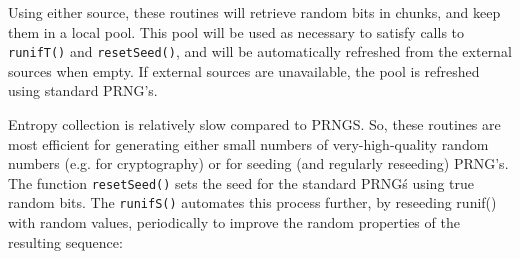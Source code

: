 \documentclass[11pt]{article}
\begin{document}
Using either source, these routines will retrieve random bits in chunks,
 and keep them in a local pool. This pool will be used as necessary to 
 satisfy calls to \texttt{runifT()} and \texttt{resetSeed()},
  and will be automatically refreshed from the external sources when empty. 
  If external sources are unavailable, the pool is refreshed using standard PRNG's.

Entropy collection is relatively slow compared to PRNGS. So, these routines
are most efficient for generating either small numbers of very-high-quality random
numbers (e.g. for cryptography) or for seeding (and regularly reseeding) PRNG's. 
The function \texttt{resetSeed()} sets the seed for the standard PRNG\'s using
true random bits.  The \texttt{runifS()} automates this process further, by  reseeding 
runif() with random values, periodically to improve the random properties of the
 resulting sequence:
\end{document}
